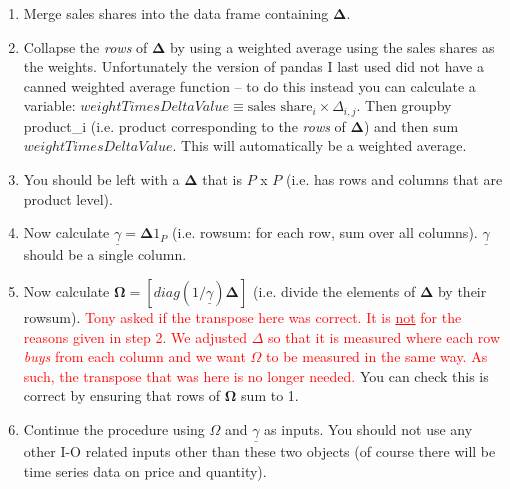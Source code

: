 \documentclass[12pt,english]{article}
\newcommand{\hlight}[1]{\textcolor{org}{#1}}
\newcommand{\rlight}[1]{\textcolor{red}{#1}}
\begin{document}
\begin{enumerate}
	\item Merge sales shares into the data frame containing $\mathbold{\Delta}$. 
	\item Collapse the \emph{rows} of $\mathbold{\Delta}$ by using a weighted average using the sales shares as the weights. Unfortunately the version of pandas I last used did not have a canned weighted average function -- to do this instead you can calculate a variable: $weightTimesDeltaValue \equiv \text{sales share}_i \times \Delta_{i,j}$. Then groupby product\_i (i.e. product corresponding to the \emph{rows} of $\mathbold{\Delta}$) and then sum $weightTimesDeltaValue$. This will automatically be a weighted average.
	\item You should be left with a $\mathbold{\Delta}$ that is $P$ x $P$ (i.e. has rows and columns that are product level).
	\item Now calculate $\underline{\gamma} = \mathbold{\Delta}1_P$ (i.e. rowsum: for each row, sum over all columns). $\underline{\gamma}$ should be a single column.
	\item Now calculate $\mathbold{\Omega} = [diag(1/\underline{\gamma})\mathbold{\Delta}]$ (i.e. divide the elements of $\mathbold{\Delta}$ by their rowsum). \rlight{Tony asked if the transpose here was correct. It is \underline{not} for the reasons given in step 2. We adjusted $\Delta$ so that it is measured where each row \emph{buys} from each column and we want $\Omega$ to be measured in the same way. As such, the transpose that was here is no longer needed.} \hlight{You can check this is correct by ensuring that rows of $\mathbold{\Omega}$ sum to 1.}
	\item Continue the procedure using $\Omega$ and $\underline{\gamma}$ as inputs. You should not use any other I-O related inputs other than these two objects (of course there will be time series data on price and quantity).
\end{enumerate}
\end{document}
